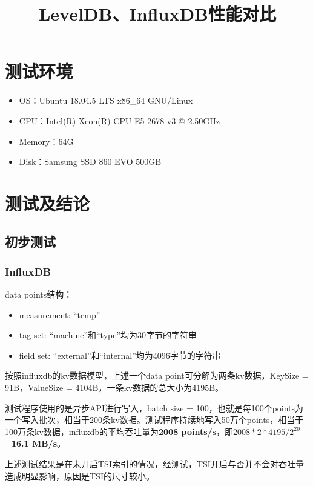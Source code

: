 \documentclass{article}
\begin{document}
	
\title{LevelDB、InfluxDB性能对比}
\date{}
\maketitle

\section{测试环境}
\begin{small}
\begin{itemize}
	\item OS：Ubuntu 18.04.5 LTS x86\_64 GNU/Linux
	\item CPU：Intel(R) Xeon(R) CPU E5-2678 v3 @ 2.50GHz
	\item Memory：64G
	\item Disk：Samsung SSD 860 EVO 500GB
\end{itemize}
\end{small}

\section{测试及结论}
\subsection{初步测试}
\subsubsection{InfluxDB}
data points结构：
\begin{small}
\begin{itemize}
	\item measurement: ``temp''
	\item tag set: ``machine''和``type''均为30字节的字符串
	\item field set: ``external''和``internal''均为4096字节的字符串
\end{itemize}
\end{small}

按照influxdb的kv数据模型，上述一个data point可分解为两条kv数据，KeySize = 91B，ValueSize = 4104B，一条kv数据的总大小为4195B。

测试程序使用的是异步API进行写入，batch size = 100，也就是每100个points为一个写入批次，相当于200条kv数据。测试程序持续地写入50万个points，相当于100万条kv数据，influxdb的平均吞吐量为\textbf{2008 points/s}，即$2008*2*4195/2^{20}$=\textbf{16.1 MB/s}。

上述测试结果是在未开启TSI索引的情况，经测试，TSI开启与否并不会对吞吐量造成明显影响，原因是TSI的尺寸较小。
\end{document}
